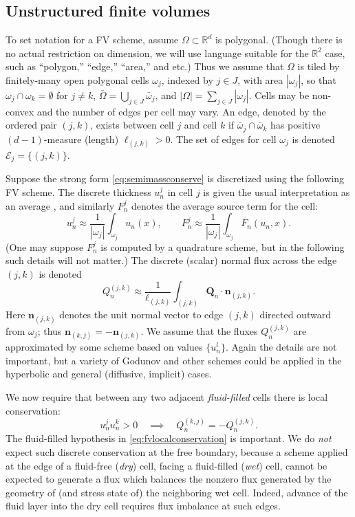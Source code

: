 \documentclass[final,onefignum]{siamart190516}
\newcommand\bn{\mathbf{n}}
\newcommand\bQ{\mathbf{Q}}
\newcommand\RR{\mathbb{R}}
\begin{document}
\subsection{Unstructured finite volumes} \label{subsec:spacenotation}  To set notation for a FV scheme, assume $\Omega \subset \RR^d$ is polygonal.  (Though there is no actual restriction on dimension, we will use language suitable for the $\RR^2$ case, such as ``polygon,'' ``edge,'' ``area,'' and etc.)  Thus we assume that $\Omega$ is tiled by finitely-many open polygonal cells $\omega_j$, indexed by $j\in J$, with area $|\omega_j|$, so that $\omega_j \cap \omega_k = \emptyset$ for $j\ne k$, $\bar\Omega = \bigcup_{j\in J} \bar \omega_j$, and $|\Omega| = \sum_{j\in J} |\omega_j|$.  Cells may be non-convex and the number of edges per cell may vary.  An edge, denoted by the ordered pair $(j,k)$, exists between cell $j$ and cell $k$ if $\bar\omega_j \cap \bar \omega_k$ has positive $(d-1)$-measure (length) $\ell_{(j,k)}>0$.  The set of edges for cell $\omega_j$ is denoted $\mathcal{E}_j=\{(j,k)\}$.

Suppose the strong form \eqref{eq:semimassconserve} is discretized using the following FV scheme.  The discrete thickness $u_n^j$ in cell $j$ is given the usual interpretation as an average \cite{LeVeque2002}, and similarly $F_n^j$ denotes the average source term for the cell:
\begin{equation}
u_n^j \approx \frac{1}{|\omega_j|} \int_{\omega_j} u_n(x), \qquad F_n^j \approx \frac{1}{|\omega_j|} \int_{\omega_j} F_n(u_n,x).  \label{eq:fvthickness}
\end{equation}
(One may suppose $F_n^j$ is computed by a quadrature scheme, but in the following such details will not matter.)  The discrete (scalar) normal flux across the edge $(j,k)$ is denoted
\begin{equation}
Q_n^{(j,k)} \approx \frac{1}{\ell_{(j,k)}} \int_{(j,k)} \bQ_n \cdot \bn_{(j,k)}. \label{eq:fvflux}
\end{equation}
Here $\bn_{(j,k)}$ denotes the unit normal vector to edge $(j,k)$ directed outward from $\omega_j$; thus $\bn_{(k,j)} = -\bn_{(j,k)}$.  We assume that the fluxes $Q_n^{(j,k)}$ are approximated by some scheme based on values $\{u_n^l\}$.  Again the details are not important, but a variety of Godunov and other schemes could be applied in the hyperbolic \cite{LeVeque2002} and general (diffusive, implicit) \cite{Morton2018} cases.

We now require that between any two adjacent \emph{fluid-filled} cells there is local conservation:
\begin{equation}
  u_n^j u_n^k > 0 \quad \implies \quad Q_n^{(k,j)}=-Q_n^{(j,k)}.  \label{eq:fvlocalconservation}
\end{equation}
The fluid-filled hypothesis in \eqref{eq:fvlocalconservation} is important.  We do \emph{not} expect such discrete conservation at the free boundary, because a scheme applied at the edge of a fluid-free (\emph{dry}) cell, facing a fluid-filled (\emph{wet}) cell, cannot be expected to generate a flux which balances the nonzero flux generated by the geometry of (and stress state of) the neighboring wet cell.  Indeed, advance of the fluid layer into the dry cell requires flux imbalance at such edges.
\end{document}
